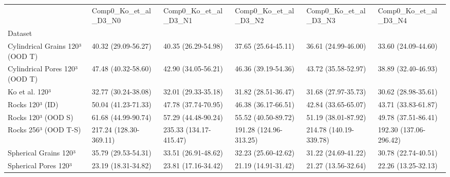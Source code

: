 \begin{tabular}{llllll}
\toprule
 & Comp0_Ko_et_al_D3_N0 & Comp0_Ko_et_al_D3_N1 & Comp0_Ko_et_al_D3_N2 & Comp0_Ko_et_al_D3_N3 & Comp0_Ko_et_al_D3_N4 \\
Dataset &  &  &  &  &  \\
\midrule
Cylindrical Grains 120³ (OOD T) & 40.32 (29.09-56.27) & 40.35 (26.29-54.98) & 37.65 (25.64-45.11) & 36.61 (24.99-46.00) & 33.60 (24.09-44.60) \\
Cylindrical Pores 120³ (OOD T) & 47.48 (40.32-58.60) & 42.90 (34.05-56.21) & 46.36 (39.19-54.36) & 43.72 (35.58-52.97) & 38.89 (32.40-46.93) \\
Ko et al. 120³ & 32.77 (30.24-38.08) & 32.01 (29.33-35.18) & 31.82 (28.51-36.47) & 31.68 (27.97-35.73) & 30.62 (28.98-35.61) \\
Rocks 120³ (ID) & 50.04 (41.23-71.33) & 47.78 (37.74-70.95) & 46.38 (36.17-66.51) & 42.84 (33.65-65.07) & 43.71 (33.83-61.87) \\
Rocks 120³ (OOD S) & 61.68 (44.99-90.74) & 57.29 (44.48-90.24) & 55.52 (40.50-89.72) & 51.19 (38.01-87.92) & 49.78 (37.51-86.41) \\
Rocks 256³ (OOD T-S) & 217.24 (128.30-369.11) & 235.33 (134.17-415.47) & 191.28 (124.96-313.25) & 214.78 (140.19-339.78) & 192.30 (137.06-296.42) \\
Spherical Grains 120³ & 35.79 (29.53-54.31) & 33.51 (26.91-48.62) & 32.23 (25.60-42.62) & 31.22 (24.69-41.22) & 30.78 (22.74-40.51) \\
Spherical Pores 120³ & 23.19 (18.31-34.82) & 23.81 (17.16-34.42) & 21.19 (14.91-31.42) & 21.27 (13.56-32.64) & 22.26 (13.25-32.13) \\
\bottomrule
\end{tabular}

